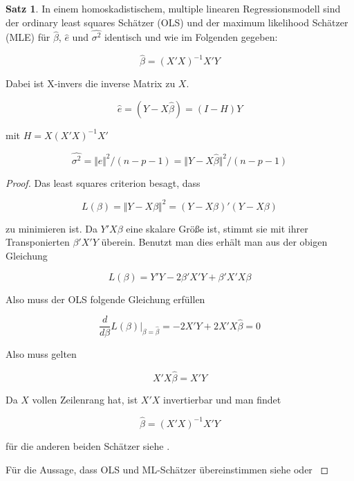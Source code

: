 \documentclass[12pt,a4paper]{article}
\theoremstyle{definition}
\theoremstyle{definition}
\newtheorem{Satz}[Definition]{Satz}
\theoremstyle{definition}
\theoremstyle{definition}
\begin{document}
\begin{Satz}
\label{erster Satz}
In einem homoskadistischem, multiple linearen Regressionsmodell sind der ordinary least squares Schätzer (OLS) und der maximum likelihood Schätzer (MLE) für $\hat{\beta}$, $\hat{e}$ und $\widehat{\sigma^2}$ identisch und wie im Folgenden gegeben:

\begin{equation} \label{beta}
\hat{\beta} = (X'X)^{-1} X' Y
\end{equation}

Dabei ist \gls{X-invers} die inverse Matrix zu $X$.

\begin{equation} \label{e}
\hat{e} = (Y-X \hat{\beta}) = (I-H)Y
\end{equation}

mit $H=X(X'X)^{-1}X'$

\begin{equation} \label{sigma}
\widehat{\sigma^2} = \Vert \hat{e} \Vert^{2} / (n-p-1) = \Vert Y - X \hat{\beta} \Vert^{2} / (n-p-1)
\end{equation}

\end{Satz}

\begin{proof}
Das least squares criterion besagt, dass 

\begin{equation*}
L(\beta)= \Vert Y - X \beta \Vert^2 = (Y - X \beta)' (Y - X \beta) 
\end{equation*}

zu minimieren ist. Da $Y'X\beta$ eine skalare Größe ist, stimmt sie mit ihrer Transponierten $\beta'X'Y$ überein. Benutzt man dies erhält man aus der obigen Gleichung

\begin{equation*}
L(\beta) = Y'Y - 2\beta'X'Y  + \beta'X'X\beta
\end{equation*}

Also muss der OLS folgende Gleichung erfüllen

\begin{equation}
\frac{d}{d \beta} L(\beta) \vert_{\beta=\hat{\beta}} = -2X'Y + 2 X'X \hat{\beta} = 0
\end{equation}

Also muss gelten

\begin{equation}
X'X \hat{\beta} = X'Y
\end{equation}

Da $X$ vollen Zeilenrang hat, ist $X'X$ invertierbar und man findet

\begin{equation*}
\hat{\beta} = (X'X)^{-1}X'Y
\end{equation*}

für die anderen beiden Schätzer siehe \cite[4]{Liu64}.

Für die Aussage, dass OLS und ML-Schätzer übereinstimmen siehe \cite[74]{Munk13} oder \cite[3]{Liu64}
\end{proof}
\end{document}
